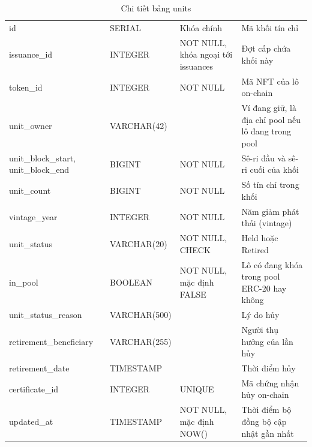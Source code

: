 \begin{table}[!htbp]
    \centering
    \caption{Chi tiết bảng units}
    \label{tab:csdl-units}
    \small
    \begin{tabularx}{\textwidth}{|L{3.9cm}|L{2.85cm}|L{2.6cm}|Y|}
        \hline
         &  &  &  \\
        \hline
        id & SERIAL & Khóa chính & Mã khối tín chỉ \\
        \hline
        issuance\_id & INTEGER & NOT NULL, khóa ngoại tới issuances & Đợt cấp chứa khối này \\
        \hline
        token\_id & INTEGER & NOT NULL & Mã NFT của lô on-chain \\
        \hline
        unit\_owner & VARCHAR(42) & & Ví đang giữ, là địa chỉ pool nếu lô đang trong pool \\
        \hline
        unit\_block\_start, unit\_block\_end & BIGINT & NOT NULL & Sê-ri đầu và sê-ri cuối của khối \\
        \hline
        unit\_count & BIGINT & NOT NULL & Số tín chỉ trong khối \\
        \hline
        vintage\_year & INTEGER & NOT NULL & Năm giảm phát thải (vintage) \\
        \hline
        unit\_status & VARCHAR(20) & NOT NULL, CHECK & Held hoặc Retired \\
        \hline
        in\_pool & BOOLEAN & NOT NULL, mặc định FALSE & Lô có đang khóa trong pool ERC-20 hay không \\
        \hline
        unit\_status\_reason & VARCHAR(500) & & Lý do hủy \\
        \hline
        retirement\_beneficiary & VARCHAR(255) & & Người thụ hưởng của lần hủy \\
        \hline
        retirement\_date & TIMESTAMP & & Thời điểm hủy \\
        \hline
        certificate\_id & INTEGER & UNIQUE & Mã chứng nhận hủy on-chain \\
        \hline
        updated\_at & TIMESTAMP & NOT NULL, mặc định NOW() & Thời điểm bộ đồng bộ cập nhật gần nhất \\
        \hline
    \end{tabularx}
\end{table}

